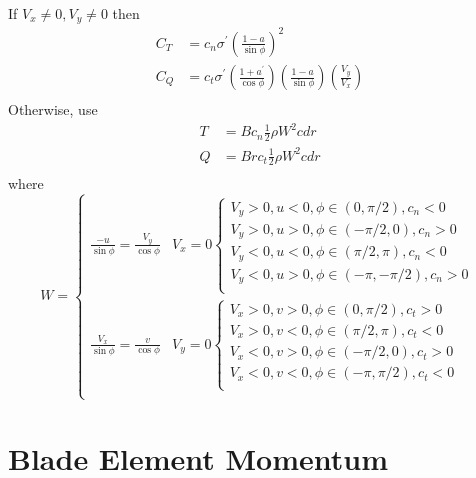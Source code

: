 \documentclass{article}
\begin{document}
If $V_x \ne 0, V_y \ne 0$ then
\begin{equation}
\begin{aligned}
C_T &= c_n \sigma^\prime \left(\frac{1-a}{\sin\phi}\right)^2 \\
C_Q &= c_t \sigma^\prime \left(\frac{1 + a^\prime}{\cos\phi}\right)\left(\frac{1 - a}{\sin\phi}\right)\left(\frac{V_y}{V_x}\right)\\
\end{aligned}
\end{equation}
Otherwise, use
\begin{equation}
\begin{aligned}
    T &= B c_n \frac{1}{2}\rho W^2 c dr \\
    Q &= B r c_t \frac{1}{2}\rho W^2 c dr \\
\end{aligned}
\end{equation}
where
\begin{equation}
    W =
    \begin{cases}
        \frac{-u}{\sin\phi} = \frac{V_y}{\cos\phi} & V_x = 0
        \begin{cases}
            V_y > 0, u < 0, \phi \in (0, \pi/2), c_n < 0\\
            V_y > 0, u > 0, \phi \in (-\pi/2, 0), c_n > 0\\
            V_y < 0, u < 0, \phi \in (\pi/2, \pi), c_n < 0\\
            V_y < 0, u > 0, \phi \in (-\pi, -\pi/2), c_n > 0\\
        \end{cases}\\
        \frac{V_x}{\sin\phi} = \frac{v}{\cos\phi} & V_y = 0
        \begin{cases}
            V_x > 0, v > 0, \phi \in (0, \pi/2), c_t > 0\\
            V_x > 0, v < 0, \phi \in (\pi/2, \pi), c_t < 0\\
            V_x < 0, v > 0, \phi \in (-\pi/2, 0), c_t > 0\\
            V_x < 0, v < 0, \phi \in (-\pi, \pi/2), c_t < 0\\
        \end{cases}\\
    \end{cases}
    \label{eq:Wopt}
\end{equation}




\section{Blade Element Momentum}
\end{document}
